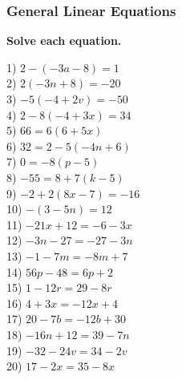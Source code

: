 \documentclass[12pt]{book}
\theoremstyle{definition}
\begin{document}
\subsubsection*{General Linear Equations}
{\bf Solve each equation.}
\begin{multicols}{3}
  1) $2 - (- 3 a - 8) = 1$\\
  2) $2 (- 3 n + 8) = - 20$\\
  3) $- 5 (- 4 + 2 v) = - 50$\\
  4) $2 - 8 (- 4 + 3 x) = 34$\\
  5) $66 = 6 (6 + 5 x) $\\
	6) $32 = 2 - 5 (- 4 n + 6)$\\
  7) $0 = - 8 (p - 5)$\\
  8) $- 55 = 8 + 7 (k - 5)$\\
  9) $- 2 + 2 (8 x - 7) = - 16$\\
  10) $- (3 - 5 n) = 12$\\
  11) $- 21 x + 12 = - 6 - 3 x$\\
  12) $- 3 n - 27 = - 27 - 3 n$\\
  13) $- 1 - 7 m = - 8 m + 7$\\
  14) $56 p - 48 = 6 p + 2$\\
  15) $1 - 12 r = 29 - 8 r$\\
  16) $4 + 3 x = - 12 x + 4$\\
  17) $20 - 7 b = - 12 b + 30$\\
  18) $- 16 n + 12 = 39 - 7 n$\\
  19) $- 32 - 24 v = 34 - 2 v$\\
  20) $17 - 2 x = 35 - 8 x$
	\end{multicols}
\end{document}
